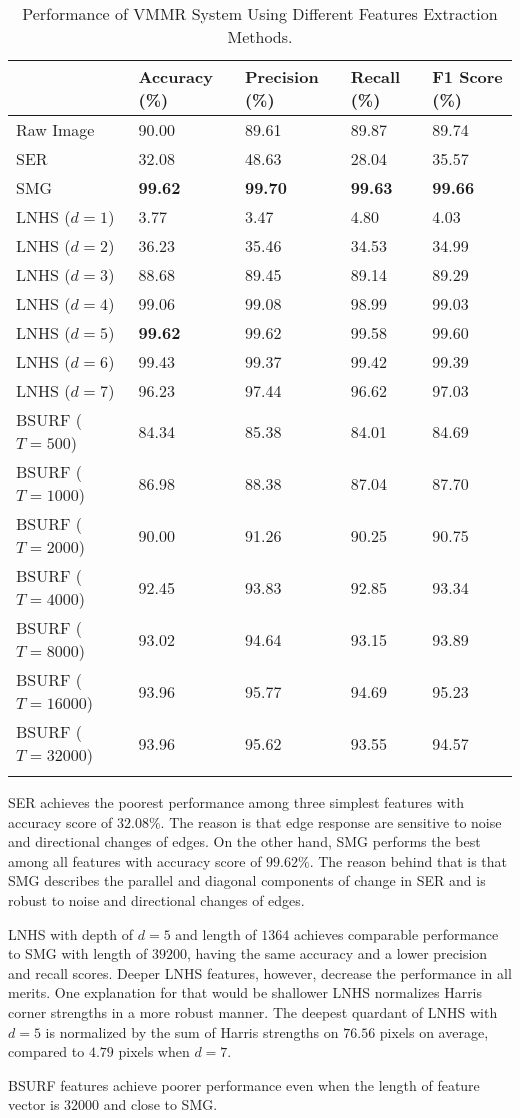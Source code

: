 \begin{longtable}[]{@{}lllll@{}}
\toprule
& Accuracy (\%) & Precision (\%) & Recall (\%) & F1 Score
(\%)\tabularnewline
\midrule
\endhead
Raw Image & 90.00 & 89.61 & 89.87 & 89.74\tabularnewline
SER & 32.08 & 48.63 & 28.04 & 35.57\tabularnewline
SMG & \textbf{99.62} & \textbf{99.70} & \textbf{99.63} &
\textbf{99.66}\tabularnewline
LNHS (\(d = 1\)) & 3.77 & 3.47 & 4.80 & 4.03\tabularnewline
LNHS (\(d = 2\)) & 36.23 & 35.46 & 34.53 & 34.99\tabularnewline
LNHS (\(d = 3\)) & 88.68 & 89.45 & 89.14 & 89.29\tabularnewline
LNHS (\(d = 4\)) & 99.06 & 99.08 & 98.99 & 99.03\tabularnewline
LNHS (\(d = 5\)) & \textbf{99.62} & 99.62 & 99.58 & 99.60\tabularnewline
LNHS (\(d = 6\)) & 99.43 & 99.37 & 99.42 & 99.39\tabularnewline
LNHS (\(d = 7\)) & 96.23 & 97.44 & 96.62 & 97.03\tabularnewline
BSURF (\(T = 500\)) & 84.34 & 85.38 & 84.01 & 84.69\tabularnewline
BSURF (\(T = 1000\)) & 86.98 & 88.38 & 87.04 & 87.70\tabularnewline
BSURF (\(T = 2000\)) & 90.00 & 91.26 & 90.25 & 90.75\tabularnewline
BSURF (\(T = 4000\)) & 92.45 & 93.83 & 92.85 & 93.34\tabularnewline
BSURF (\(T = 8000\)) & 93.02 & 94.64 & 93.15 & 93.89\tabularnewline
BSURF (\(T = 16000\)) & 93.96 & 95.77 & 94.69 & 95.23\tabularnewline
BSURF (\(T = 32000\)) & 93.96 & 95.62 & 93.55 & 94.57\tabularnewline
\bottomrule
\caption{Performance of VMMR System Using Different Features Extraction Methods.}
\label{tab:features}
\end{longtable}

SER achieves the poorest performance among three simplest features with accuracy score of $32.08\%$. The reason is that edge response are sensitive to noise and directional changes of edges.
On the other hand, SMG performs the best among all features with accuracy score of $99.62\%$.
The reason behind that is that SMG describes the parallel and diagonal components of change in SER and is robust to noise and directional changes of edges.

LNHS with depth of $d = 5$ and length of $1364$ achieves comparable performance to SMG with length of $39200$, having the same accuracy and a lower precision and recall scores.
Deeper LNHS features, however, decrease the performance in all merits.
One explanation for that would be shallower LNHS normalizes Harris corner strengths in a more robust manner.
The deepest quardant of LNHS with $d = 5$ is normalized by the sum of Harris strengths on $76.56$ pixels on average, compared to $4.79$ pixels when $d = 7$.

BSURF features achieve poorer performance even when the length of feature vector is $32000$ and close to SMG.

